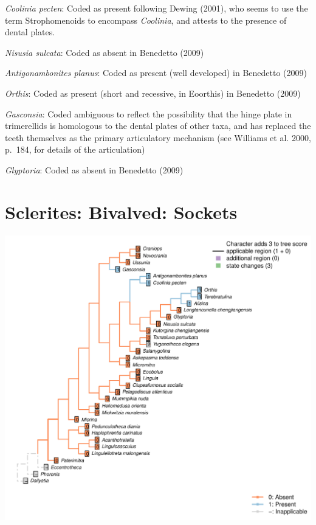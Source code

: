 \documentclass[]{book}
\theoremstyle{definition}
\theoremstyle{definition}
\theoremstyle{definition}
\theoremstyle{remark}
\begin{document}
\emph{Coolinia pecten}: Coded as present following Dewing (2001), who
seems to use the term Strophomenoids to encompass \emph{Coolinia}, and
attests to the presence of dental plates.

\emph{Nisusia sulcata}: Coded as absent in Benedetto (2009)

\emph{Antigonambonites planus}: Coded as present (well developed) in
Benedetto (2009)

\emph{Orthis}: Coded as present (short and recessive, in Eoorthis) in
Benedetto (2009)

\emph{Gasconsia}: Coded ambiguous to reflect the possibility that the
hinge plate in trimerellids is homologous to the dental plates of other
taxa, and has replaced the teeth themselves as the primary articulatory
mechanism (see Williams et al. 2000, p.~184, for details of the
articulation)

\emph{Glyptoria}: Coded as absent in Benedetto (2009)

\hypertarget{sclerites-bivalved-sockets}{%
\section*{Sclerites: Bivalved:
Sockets}\label{sclerites-bivalved-sockets}}

\includegraphics{Brachiopod_phylogeny_files/figure-latex/unnamed-chunk-5-7.pdf}
\end{document}

